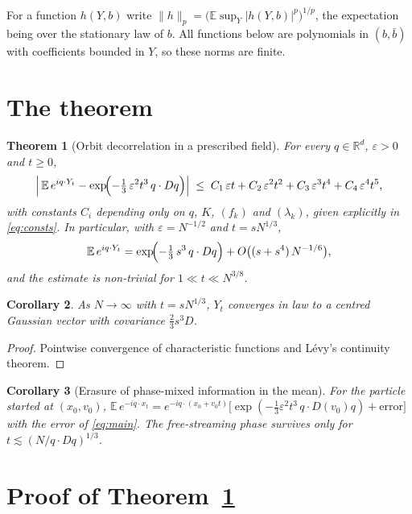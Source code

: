 \documentclass[11pt]{article}
\newcommand{\E}{\mathbb{E}}
\newcommand{\eps}{\varepsilon}
\newcommand{\nrm}[2]{\|#1\|_{#2}}
\newtheorem{theorem}{Theorem}
\newtheorem{corollary}[theorem]{Corollary}
\theoremstyle{remark}
\begin{document}
For a function $h(Y,b)$ write
$\nrm{h}{p} = \bigl(\E\sup_Y|h(Y,b)|^p\bigr)^{1/p}$, the expectation being
over the stationary law of $b$. All functions below are polynomials in
$(b,\bar b)$ with coefficients bounded in $Y$, so these norms are finite.

\section{The theorem}

\begin{theorem}[Orbit decorrelation in a prescribed field]\label{thm:main}
For every $q\in\mathbb{R}^d$, $\eps>0$ and $t\ge 0$,
\begin{equation}
  \Bigl|\,\E\,e^{iq\cdot Y_t} - \exp\!\Bigl(-\tfrac13\,\eps^2t^3\,q\cdot Dq\Bigr)\Bigr|
  \;\le\; C_1\,\eps t + C_2\,\eps^2t^2 + C_3\,\eps^3t^4 + C_4\,\eps^4t^5 ,
  \label{eq:main}
\end{equation}
with constants $C_i$ depending only on $q$, $K$, $(f_k)$ and $(\lambda_k)$,
given explicitly in \eqref{eq:consts}. In particular, with $\eps = N^{-1/2}$
and $t = sN^{1/3}$,
\[
  \E\,e^{iq\cdot Y_t} = \exp\!\Bigl(-\tfrac13\,s^3\,q\cdot Dq\Bigr)
  + O\bigl((s + s^4)\,N^{-1/6}\bigr),
\]
and the estimate is non-trivial for $1\ll t\ll N^{3/8}$.
\end{theorem}

\begin{corollary}\label{cor:law}
As $N\to\infty$ with $t = sN^{1/3}$, $Y_t$ converges in law to a centred
Gaussian vector with covariance $\tfrac23 s^3 D$.
\end{corollary}

\begin{proof}
Pointwise convergence of characteristic functions and L\'evy's continuity
theorem.
\end{proof}

\begin{corollary}[Erasure of phase-mixed information in the mean]\label{cor:mem}
For the particle started at $(x_0,v_0)$,
$\E\,e^{-iq\cdot x_t} = e^{-iq\cdot(x_0+v_0t)}
\bigl[\exp(-\tfrac13\eps^2t^3\,q\cdot D(v_0)q) + \text{error}\bigr]$ with the
error of \eqref{eq:main}. The free-streaming phase survives only for
$t\lesssim(N/q\cdot Dq)^{1/3}$.
\end{corollary}

\section{Proof of Theorem~\ref{thm:main}}
\end{document}
